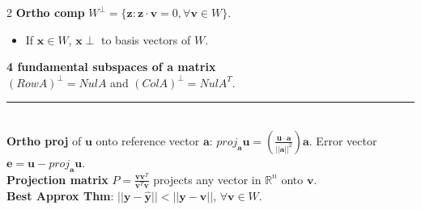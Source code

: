 \documentclass[10pt]{article}
\begin{document}
\begin{multicols*}{2}
\textbf{Ortho comp} $W^{\perp} = \{\mathbf{z}:\mathbf{z}\cdot\mathbf{v}=0, \forall\mathbf{v}\in W\}$.\\
\begin{itemize}
    \item If $\mathbf{x}\in W$, $\mathbf{x} \perp$ to basis vectors of $W$.
\end{itemize}
\textbf{4 fundamental subspaces of a matrix}\\
$(Row A)^{\perp} = Nul A$ and $(Col A)^{\perp} = Nul A^T$.\\[-6pt]
\rule{\linewidth}{0.4pt}\\[-2pt]
\textbf{Ortho proj} of $\mathbf{u}$ onto reference vector $\mathbf{a}$: $proj_{\mathbf{a}}\mathbf{u} = \left(\frac{\mathbf{u} \cdot \mathbf{a}}{||\mathbf{a}||^2}\right)\mathbf{a}$.
Error vector $\mathbf{e} = \mathbf{u} - proj_{\mathbf{a}}\mathbf{u}$.\\
\textbf{Projection matrix} $P = \frac{\mathbf{v}\mathbf{v}^T}{\mathbf{v}^T \mathbf{v}}$ projects any vector in $\mathbb{R}^n$ onto $\mathbf{v}$.\\
\textbf{Best Approx Thm}: $||\mathbf{y} - \hat{\mathbf{y}}|| < ||\mathbf{y} - \mathbf{v}||$, $\forall \mathbf{v}\in W$.\\


\noindent
{}


\end{multicols*}
\end{document}
